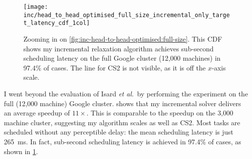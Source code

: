 %

\begin{figure}
    \texttt{[image: inc/head\_to\_head\_optimised\_full\_size\_incremental\_only\_target\_latency\_cdf\_1col]}
    \caption[Performance of my incremental algorithm on the full Google cluster]{Zooming in on \cref{fig:inc-head-to-head-optimised:full-size}. This CDF shows my incremental relaxation algorithm achieves sub-second scheduling latency on the full Google cluster (12,000 machines) in 97.4\% of cases. The line for CS2 is not visible, as it is off the $x$-axis scale.}
    \label{fig:inc-head-to-head-optimised-inconly}
\end{figure}

I went beyond the evaluation of Isard \textit{et al.}\ by performing the experiment on the full (12,000 machine) Google cluster.  shows that my incremental solver delivers an average speedup of $11\times$. This is comparable to the speedup on the 3,000 machine cluster, suggesting my algorithm scales as well as CS2. Most tasks are scheduled without any perceptible delay: the mean scheduling latency is just \SI{265}{\milli\second}. In fact, sub-second scheduling latency is achieved in 97.4\% of cases, as shown in \cref{fig:inc-head-to-head-optimised-inconly}.


